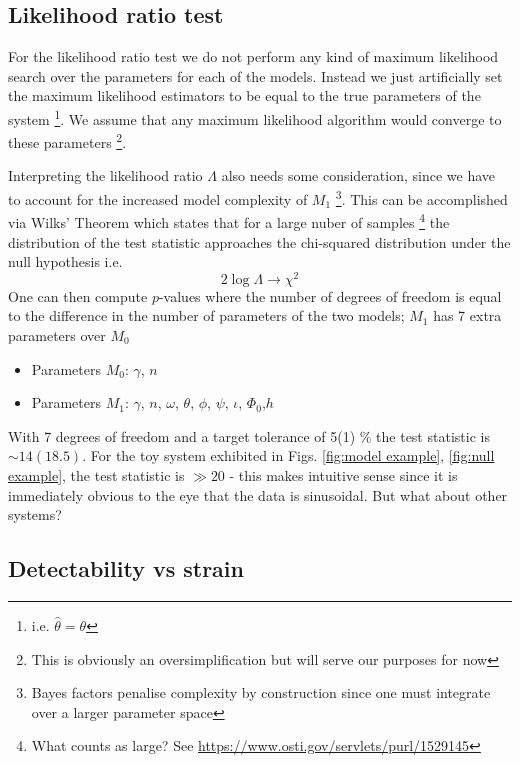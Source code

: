 \documentclass{tufte-handout} %
\begin{document}
\subsection{Likelihood ratio test}
For the likelihood ratio test we do not perform any kind of maximum likelihood search over the parameters for each of the models. Instead we just artificially set the maximum likelihood estimators to be equal to the true parameters of the system \footnote{i.e. $\hat{\theta} = \theta$}. We assume that any maximum likelihood algorithm would converge to these parameters \footnote{This is obviously an oversimplification but will serve our purposes for now}. \newline  


\noindent Interpreting the likelihood ratio $\Lambda$ also needs some consideration, since we have to account for the increased model complexity of $M_1$ \footnote{Bayes factors penalise complexity by construction since one must integrate over a larger parameter space}. This can be accomplished via Wilks' Theorem which states that for a large nuber of samples \footnote{What counts as large? See \url{https://www.osti.gov/servlets/purl/1529145}} the distribution of the test statistic approaches the chi-squared distribution under the null hypothesis i.e. 
\begin{equation}
2 \log \Lambda \rightarrow \chi^2
\end{equation}
One can then compute $p$-values where the number of degrees of freedom is equal to the difference in the number of parameters of the two models; $M_1$ has 7 extra parameters over $M_0$

\begin{itemize}
	\item Parameters $M_0$: $\gamma$, $n$
	\item Parameters $M_1$: $\gamma$, $n$, $\omega$, $\theta$, $\phi$, $\psi$, $\iota$, $\Phi_0$,$h$
\end{itemize}
With 7 degrees of freedom and a target tolerance of 5(1) \% the test statistic is $\sim 14 (18.5)$. For the toy system exhibited in Figs. \ref{fig:model  example}, \ref{fig:null example}, the test statistic is $\gg 20$ - this makes intuitive sense since it is immediately obvious to the eye that the data is sinusoidal. But what about other systems? 


\subsection{Detectability vs strain}
\end{document}
